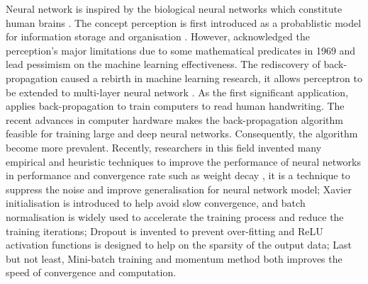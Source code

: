 
Neural network is inspired by the biological neural networks which constitute human brains \citep{10.2307/4299364}.
The concept perception is first introduced as a probablistic model for information storage and organisation \citep{rosenblatt}.
However, \citet{minsky69perceptrons} acknowledged the perception's major limitations due to some mathematical predicates in 1969 and lead pessimism on the machine learning effectiveness.
The rediscovery of back-propagation caused a rebirth in machine learning research, it allows perceptron to be extended to multi-layer neural network \citep{58337}. As the first significant application, \citet{NIPS1989293} applies back-propagation to train computers to read human handwriting. The recent advances in computer hardware makes the back-propagation algorithm feasible for training large and deep neural networks. Consequently, the algorithm become more prevalent. Recently, researchers in this field invented many empirical and heuristic techniques to improve the performance of neural networks in performance and convergence rate such as weight decay \citet{NIPS1991563}, it is a technique to suppress the noise and improve generalisation for neural network model;
Xavier initialisation \citet{pmlr-v9-glorot10a} is introduced to help avoid slow convergence, and batch normalisation \citep{pmlr-v37-ioffe15} is widely used to accelerate the training process and reduce the training iterations;
Dropout \citep{DBLP:journals/corr/abs-1207-0580} is invented to prevent over-fitting and ReLU activation functions \citet{relu-hahnloser} is designed to help on the sparsity of the output data;
Last but not least, Mini-batch training \citep{DBLP:journals/corr/GoyalDGNWKTJH17} and momentum method  \citet{rumelhart1986learning} both improves the speed of convergence and computation.


